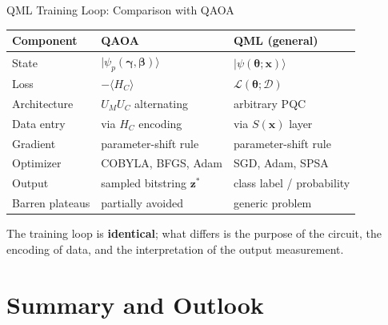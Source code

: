 \documentclass{beamer}
\begin{document}
\begin{frame}{QML Training Loop: Comparison with QAOA}
\begin{center}
\small
\begin{tabular}{lll}
\hline
\textbf{Component} & \textbf{QAOA} & \textbf{QML (general)} \\
\hline
State & $|\psi_p(\boldsymbol{\gamma},\boldsymbol{\beta})\rangle$ &
  $|\psi(\boldsymbol{\theta};\mathbf{x})\rangle$ \\
Loss & $-\langle H_C\rangle$ & $\mathcal{L}(\boldsymbol{\theta};\mathcal{D})$ \\
Architecture & $U_M U_C$ alternating & arbitrary PQC \\
Data entry & via $H_C$ encoding & via $S(\mathbf{x})$ layer \\
Gradient & parameter-shift rule & parameter-shift rule \\
Optimizer & COBYLA, BFGS, Adam & SGD, Adam, SPSA \\
Output & sampled bitstring $\mathbf{z}^*$ & class label / probability \\
Barren plateaus & partially avoided & generic problem \\
\hline
\end{tabular}
\end{center}

\medskip

The training loop is \textbf{identical}; what differs is the
purpose of the circuit, the encoding of data, and the
interpretation of the output measurement.
\end{frame}

\section{Summary and Outlook}
\end{document}
